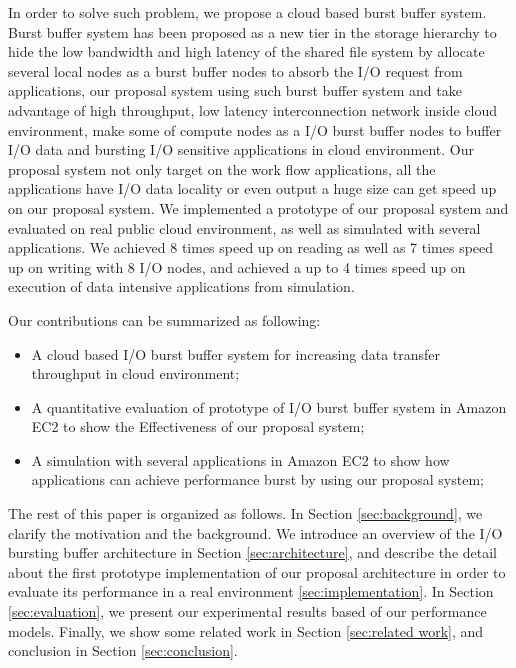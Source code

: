 In order to solve such problem, we propose a cloud based burst buffer system. Burst buffer system
has been proposed as a new tier in the storage hierarchy to hide the low bandwidth and high latency
of the shared file system by allocate several local nodes as a burst buffer nodes to absorb the I/O
request from applications, our proposal system using such burst buffer system and take advantage of
high throughput, low latency interconnection network inside cloud environment, make some of compute
nodes as a I/O burst buffer nodes to buffer I/O data and bursting I/O sensitive applications in cloud environment.
Our proposal system not only target on the work flow applications, all the applications have
I/O data locality or even output a huge size can get speed up on our proposal system.
We implemented a prototype of our proposal system and evaluated on real public cloud environment, as
well as simulated with several applications.
We achieved 8 times speed up on reading as well as 7 times speed up on writing with 8 I/O nodes, and
achieved a up to 4 times speed up on execution of data intensive applications from simulation.

Our contributions can be summarized as following:
\begin{itemize}
	\item A cloud based I/O burst buffer system for increasing data transfer throughput in cloud environment;
	\item A quantitative evaluation of prototype of I/O burst buffer system in Amazon EC2 to show the
	Effectiveness of our proposal system;
    \item A simulation with several applications in Amazon EC2 to show how applications can achieve
    performance burst by using our proposal system;
\end{itemize}
The rest of this paper is organized as follows. 
In Section \ref{sec:background}, we clarify the motivation and the background.
We introduce an overview of the I/O bursting buffer architecture in Section \ref{sec:architecture}, 
and describe the detail about the first prototype implementation of our proposal architecture in
order to evaluate its performance in a real environment \ref{sec:implementation}.
In Section \ref{sec:evaluation}, we present our experimental results based of our performance models.
Finally, we show some related work in Section \ref{sec:related work}, and conclusion in Section \ref{sec:conclusion}.
